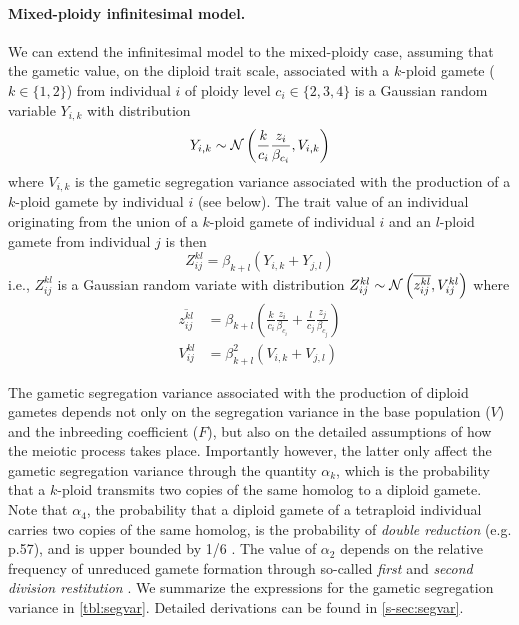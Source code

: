 \documentclass[12pt,a4paper]{article}
\begin{document}
    \paragraph{Mixed-ploidy infinitesimal model.}

    We can extend the infinitesimal model to the mixed-ploidy case, assuming that the
    gametic value, on the diploid trait scale, associated with a $k$-ploid gamete ($k
    \in \{1,2\}$) from individual $i$ of ploidy level $c_i \in \{2,3,4\}$ is a
    Gaussian random variable $Y_{i,k}$ with distribution
    \begin{equation}
        Y_{i,k} \sim \mathcal{N}\left(\frac{k}{c_i}\frac{z_i}{\beta_{c_i}}, V_{i,k}\right)
        \label{eq:gamete}
    \end{equation}
    where $V_{i,k}$ is the gametic segregation variance associated with the
    production of a $k$-ploid gamete by individual $i$ (see below).
    The trait value of an individual originating from the union of a $k$-ploid
    gamete of individual $i$ and an $l$-ploid gamete from individual $j$ is then
      $$Z_{ij}^{kl} = \beta_{k+l}\left(Y_{i,k} + Y_{j,l}\right)$$
    i.e., $Z_{ij}^{kl}$ is a Gaussian random variate with distribution
        $Z_{ij}^{kl} \sim \mathcal{N}\left(\overline{z_{ij}^{kl}},
        V_{ij}^{kl}\right)$
    where
    \begin{align}
        \overline{z_{ij}^{kl}} &= \beta_{k+l} \left(
              \frac{k}{c_i}\frac{z_i}{\beta_{c_i}} 
            + \frac{l}{c_j}\frac{z_j}{\beta_{c_j}}\right) \nonumber \\
        V_{ij}^{kl} &= \beta_{k+l}^2 (V_{i,k} + V_{j,l})
       \label{eq:oneline}
    \end{align}

    The gametic segregation variance associated with the production of diploid
    gametes depends not only on the segregation variance in the base population
    ($V$) and the inbreeding coefficient ($F$), but also on the detailed
    assumptions of how the meiotic process takes place.
    Importantly however, the latter only affect the gametic segregation variance
    through the quantity $\alpha_k$, which is the probability that a $k$-ploid
    transmits two copies of the same homolog to a diploid gamete.
    Note that $\alpha_4$, the probability that a diploid gamete of a tetraploid
    individual carries two copies of the same homolog, is the probability of
    \textit{double reduction} (e.g. \cite{lynch1998} p.57), and is upper bounded by
    1/6 \citep{stift2008}.
    The value of $\alpha_2$ depends on the relative frequency of unreduced gamete
    formation through so-called \textit{first} and \textit{second division
    restitution} \citep{bretagnolle1995,storme2013}.
    We summarize the expressions for the gametic segregation variance in
    \cref{tbl:segvar}.
    Detailed derivations can be found in \cref{s-sec:segvar}.
\end{document}
